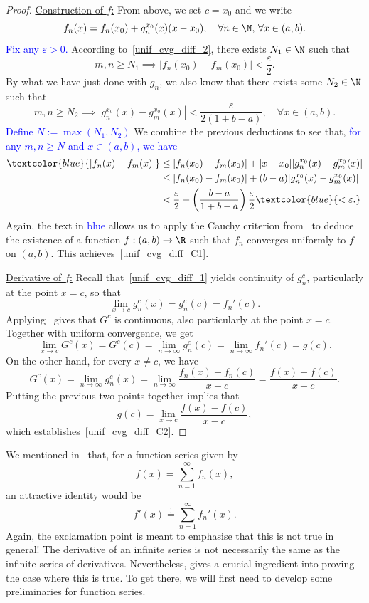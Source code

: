 \begin{proof}
	\ul{Construction of $f$:} From above, we set $c = x_0$ and we write
	\[
	f_n(x) = f_n(x_0) + g_n^{x_0}(x)(x-x_0),\quad \forall n\in\N,\,\forall x\in(a,b).
	\]
	\textcolor{blue}{Fix any $\varepsilon>0$.} According to~\ref{unif_cvg_diff_2}, there exists $N_1\in\N$ such that
	\[
	m,n\ge N_1\implies |f_n(x_0) - f_m(x_0)|<\frac{\varepsilon}{2}.
	\]
	By what we have just done with $g_n$, we also know that there exists some $N_2\in\N$ such that
	\[
	m,n\ge N_2\implies |g_n^{x_0}(x) - g_m^{x_0}(x)|<\frac{\varepsilon}{2(1 + b-a)},\quad \forall x \in (a,b).
	\]
	\textcolor{blue}{Define $N:= \max(N_1,N_2)$} We combine the previous deductions to see that, \textcolor{blue}{for any $m,n\ge N$ and $x\in (a,b)$, we have}
	\begin{align*}
		\textcolor{blue}{|f_n(x) - f_m(x)|} &\le |f_n(x_0) - f_m(x_0)| + |x-x_0||g_n^{x_0}(x) - g_m^{x_0}(x)| 	\\
		&\le |f_n(x_0) - f_m(x_0)| + (b-a)|g_n^{x_0}(x) - g_m^{x_0}(x)| 	\\
		&< \frac{\varepsilon}{2} + \left(\frac{b-a}{1 + b-a}\right)\frac{\varepsilon}{2} \textcolor{blue}{< \varepsilon.}
	\end{align*}
	Again, the text in \textcolor{blue}{blue} allows us to apply the Cauchy criterion from~ to deduce the existence of a function $f:(a,b)\to \R$ such that $f_n$ converges uniformly to $f$ on $(a,b)$. This achieves~\ref{unif_cvg_diff_C1}.
	
	\ul{Derivative of $f$:} Recall that~\ref{unif_cvg_diff_1} yields continuity of $g_n^c$, particularly at the point $x=c$, so that
	\[
	\lim_{x\to c}g_n^c(x) = g_n^c(c) = f_n'(c).
	\]
	Applying~ gives that $G^c$ is continuous, also particularly at the point $x=c$. Together with uniform convergence, we get
	\[
	\lim_{x\to c}G^c(x) = G^c(c) = \lim_{n\to \infty}g_n^c(c) = \lim_{n\to \infty}f_n'(c) = g(c).
	\]
	On the other hand, for every $x\neq c$, we have
	\[
	G^c(x) = \lim_{n\to \infty}g_n^c(x) = \lim_{n\to \infty}\frac{f_n(x)-f_n(c)}{x-c} = \frac{f(x) - f(c)}{x-c}.
	\]
	Putting the previous two points together implies that
	\[
	g(c) = \lim_{x\to c}\frac{f(x)-f(c)}{x-c},
	\]
	which establishes~\ref{unif_cvg_diff_C2}.
\end{proof}
We mentioned in~ that, for a function series given by
\[
f(x) = \sum_{n=1}^\infty f_n(x),
\]
an attractive identity would be
\[
f'(x) \overset{!}{=} \sum_{n=1}^\infty f_n'(x).
\]
Again, the exclamation point is meant to emphasise that this is not true in general! The derivative of an infinite series is not necessarily the same as the infinite series of derivatives. Nevertheless,  gives a crucial ingredient into proving the case where this is true. To get there, we will first need to develop some preliminaries for function series.